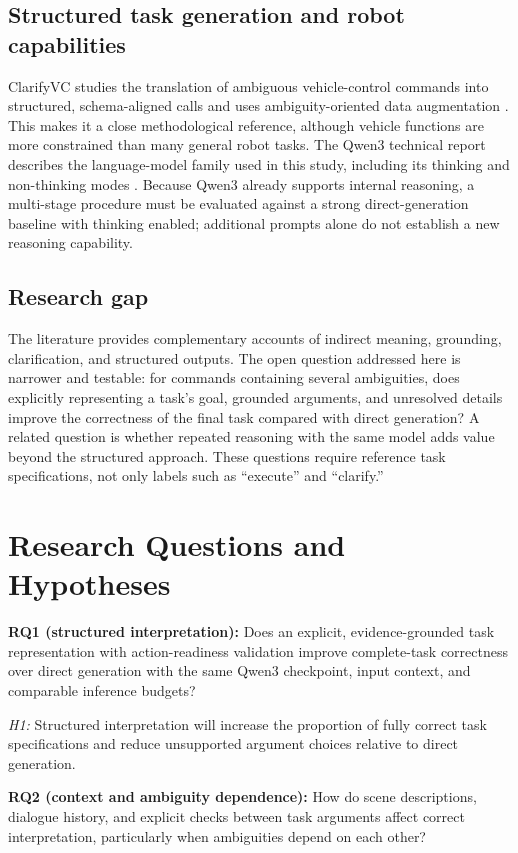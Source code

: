 \documentclass[10pt,conference]{IEEEtran}
\begin{document}
\subsection{Structured task generation and robot capabilities}
ClarifyVC studies the translation of ambiguous vehicle-control commands into structured, schema-aligned calls and uses ambiguity-oriented data augmentation \cite{clarifyvc}. This makes it a close methodological reference, although vehicle functions are more constrained than many general robot tasks. The Qwen3 technical report describes the language-model family used in this study, including its thinking and non-thinking modes \cite{qwen}. Because Qwen3 already supports internal reasoning, a multi-stage procedure must be evaluated against a strong direct-generation baseline with thinking enabled; additional prompts alone do not establish a new reasoning capability.

\subsection{Research gap}
The literature provides complementary accounts of indirect meaning, grounding, clarification, and structured outputs. The open question addressed here is narrower and testable: for commands containing several ambiguities, does explicitly representing a task's goal, grounded arguments, and unresolved details improve the correctness of the final task compared with direct generation? A related question is whether repeated reasoning with the same model adds value beyond the structured approach. These questions require reference task specifications, not only labels such as ``execute'' and ``clarify.''

\section{Research Questions and Hypotheses}
\textbf{RQ1 (structured interpretation):} Does an explicit, evidence-grounded task representation with action-readiness validation improve complete-task correctness over direct generation with the same Qwen3 checkpoint, input context, and comparable inference budgets?

\emph{H1:} Structured interpretation will increase the proportion of fully correct task specifications and reduce unsupported argument choices relative to direct generation.

\textbf{RQ2 (context and ambiguity dependence):} How do scene descriptions, dialogue history, and explicit checks between task arguments affect correct interpretation, particularly when ambiguities depend on each other?
\end{document}
